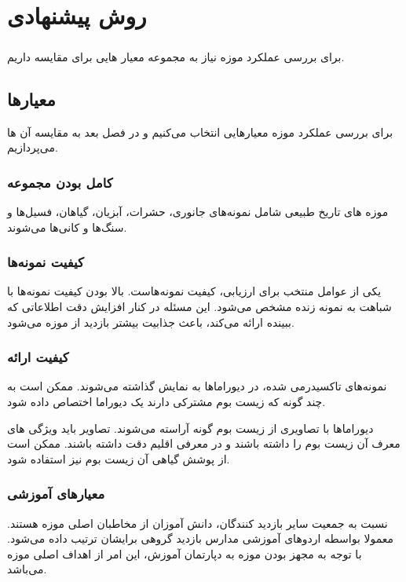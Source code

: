 
\chapter{روش پیشنهادی} \label{chapter:proposed-method}

\paragraph*{}
برای بررسی عملکرد موزه نیاز به مجموعه معیار هایی برای مقایسه داریم.

\section{معیارها}
برای بررسی عملکرد موزه معیارهایی انتخاب می‌کنیم و در فصل بعد به مقایسه آن ها می‌پردازیم.

\subsection{کامل بودن مجموعه}
موزه های تاریخ طبیعی شامل نمونه‌های جانوری، حشرات، آبزیان، گیاهان، فسیل‌ها و سنگ‌ها و کانی‌ها می‌شوند.


\subsection{کیفیت نمونه‌ها}
یکی از عوامل منتخب برای ارزیابی، کیفیت نمونه‌هاست. بالا بودن کیفیت نمونه‌ها با شباهت به نمونه زنده مشخص می‌شود. این مسئله در کنار افزایش دقت اطلاعاتی که ببینده ارائه می‌کند، باعث جذابیت بیشتر بازدید از موزه می‌شود. 


\subsection{کیفیت ارائه}

نمونه‌های تاکسیدرمی شده، در دیوراماها به نمایش گذاشته می‌شوند.
ممکن است به چند گونه که زیست بوم مشترکی دارند یک دیوراما اختصاص داده شود.

دیوراماها با تصاویری از زیست بوم گونه آراسته می‌شوند. تصاویر باید ویژگی های معرف آن زیست بوم را داشته باشند و در معرفی اقلیم دقت داشته باشند. ممکن است از پوشش گیاهی آن زیست بوم نیز استفاده شود.

\subsection{معیارهای آموزشی}
نسبت به جمعیت سایر بازدید کنندگان، دانش آموزان از مخاطبان اصلی موزه هستند. معمولا بواسطه اردوهای آموزشی مدارس بازدید گروهی برایشان ترتیب داده می‌شود.
با توجه به مجهز بودن موزه به دپارتمان آموزش، این امر از اهداف اصلی موزه می‌باشد. 



